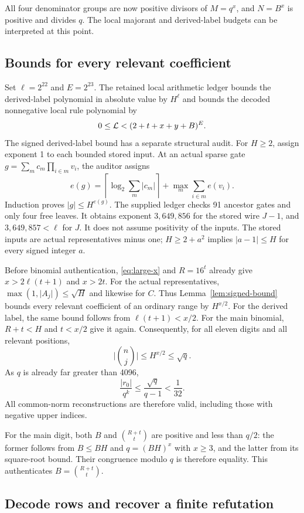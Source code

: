 \documentclass[11pt]{article}
\theoremstyle{remark}\newtheorem{remark}[theorem]{Remark}
\newcommand{\abs}[1]{\lvert #1\rvert}
\begin{document}
All four denominator groups are now positive divisors of $M=q^x$,
and $N=B^x$ is positive and divides $q$. The local majorant and
derived-label budgets can be interpreted at this point.

\subsection{Bounds for every relevant coefficient}

Set $\ell=2^{22}$ and $E=2^{23}$. The retained local arithmetic
ledger bounds the derived-label polynomial in absolute value by
$H^\ell$ and bounds the decoded nonnegative local rule polynomial by
\[
 0\le\mathcal L<(2+t+x+y+B)^E.
\]
The signed derived-label bound has a separate structural audit. For
$H\ge2$, assign exponent 1 to each bounded stored input. At an actual
sparse gate $g=\sum_m c_m\prod_{i\in m}v_i$, the auditor assigns
\[
 e(g)=\left\lceil\log_2\sum_m\abs{c_m}\right\rceil
       +\max_m\sum_{i\in m}e(v_i).
\]
Induction proves $\abs g\le H^{e(g)}$. The supplied ledger checks
91 ancestor gates and only four free leaves. It obtains exponent
$3{,}649{,}856$ for the stored wire $J-1$, and $3{,}649{,}857<\ell$
for $J$. It does not assume positivity of the inputs. The stored
inputs are actual representatives minus one; $H\ge2+a^2$ implies
$\abs{a-1}\le H$ for every signed integer $a$.

Before binomial authentication, \eqref{eq:large-x} and $R=16^t$
already give $x>2\ell(t+1)$ and $x>2t$. For the actual
representatives, $\max(1,\abs{A_j})\le\sqrt H$ and likewise for
$C$. Thus Lemma~\ref{lem:signed-bound} bounds every relevant
coefficient of an ordinary range by $H^{x/2}$. For the derived label,
the same bound follows from $\ell(t+1)<x/2$. For the main binomial,
$R+t<H$ and $t<x/2$ give it again. Consequently, for all eleven
digits and all relevant positions,
\[
 \abs{\binom nj}\le H^{x/2}\le\sqrt q.
\]
As $q$ is already far greater than 4096,
\[
 \frac{\abs{r_0}}{q^k}
 \le\frac{\sqrt q}{q-1}<\frac1{32}.
\]
All common-norm reconstructions are therefore valid, including those
with negative upper indices.

For the main digit, both $B$ and $\binom{R+t}{t}$ are positive
and less than $q/2$: the former follows from $B\le BH$ and
$q=(BH)^x$ with $x\ge3$, and the latter from its square-root bound.
Their congruence modulo $q$ is therefore equality. This authenticates
$B=\binom{R+t}{t}$.

\subsection{Decode rows and recover a finite refutation}
\end{document}

